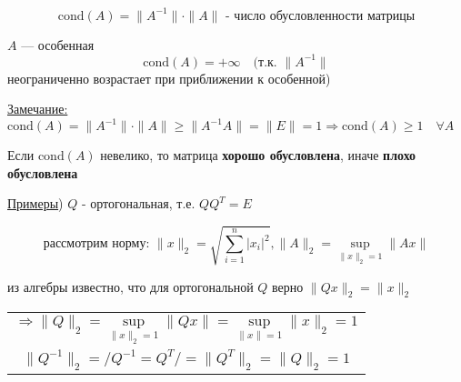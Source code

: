 



\[\text{cond}(A) = \| A^{-1} \| \cdot \| A \| \text{ - число обусловленности матрицы}\]

\( A\) — особенная \rightarrow \[\text{cond}(A) = +\infty \quad (\text{т.к. } \| A^{-1} \|\] неограниченно возрастает при приближении к особенной)

\underline{Замечание:} \(\text{cond}(A) = \| A^{-1} \| \cdot \| A \| \geq \| A^{-1}A \| = \| E \| = 1 \Rightarrow \text{cond}(A) \geq 1 \quad \forall A\)

Если \(\text{cond}(A)\) невелико, то матрица \textbf{хорошо обусловлена}, иначе \textbf{плохо обусловлена}

\underline{Примеры}) \( Q \) - ортогональная, т.е. \( QQ^T = E \)

\[\text{рассмотрим норму: }\|x\|_2 = \sqrt{\sum_{i=1}^n |x_i|^2}, \|A\|_2 = \sup_{\|x\|_2=1} \|Ax\|\]

из алгебры известно, что для ортогональной \(Q\) верно \(\|Qx\|_2 = \|x\|_2\) \Rightarrow

\begin{tabular}{c|}
\[\Rightarrow \|Q\|_2 = \sup_{\|x\|_2=1} \|Qx\| = \sup_{\|x\|=1} \|x\|_2 = 1\]\\
\[\|Q^{-1}\|_2 = /Q^{-1}=Q^T/ = \|Q^T\|_2 = \|Q\|_2 = 1\]
\end{tabular}

